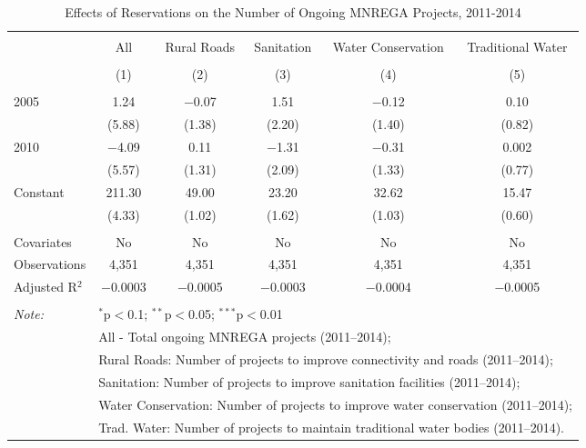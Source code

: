 
\begin{table}[!htbp] \centering 
  \caption{Effects of Reservations on the Number of Ongoing MNREGA Projects, 2011-2014} 
  \label{main_mnrega_ongoing} 
\begin{tabular}{@{\extracolsep{5pt}}lccccc} 
\\[-1.8ex]\hline 
\hline \\[-1.8ex] 
 & All & Rural Roads & Sanitation & Water Conservation & Traditional Water \\ 
\\[-1.8ex] & (1) & (2) & (3) & (4) & (5)\\ 
\hline \\[-1.8ex] 
 2005 & 1.24 & $-$0.07 & 1.51 & $-$0.12 & 0.10 \\ 
  & (5.88) & (1.38) & (2.20) & (1.40) & (0.82) \\ 
  2010 & $-$4.09 & 0.11 & $-$1.31 & $-$0.31 & 0.002 \\ 
  & (5.57) & (1.31) & (2.09) & (1.33) & (0.77) \\ 
  Constant & 211.30 & 49.00 & 23.20 & 32.62 & 15.47 \\ 
  & (4.33) & (1.02) & (1.62) & (1.03) & (0.60) \\ 
 \hline \\[-1.8ex] 
Covariates & No & No & No & No & No \\ 
Observations & 4,351 & 4,351 & 4,351 & 4,351 & 4,351 \\ 
Adjusted R$^{2}$ & $-$0.0003 & $-$0.0005 & $-$0.0003 & $-$0.0004 & $-$0.0005 \\ 
\hline 
\hline \\[-1.8ex] 
\textit{Note:}  & \multicolumn{5}{l}{$^{*}$p$<$0.1; $^{**}$p$<$0.05; $^{***}$p$<$0.01} \\ 
 & \multicolumn{5}{l}{All - Total ongoing MNREGA projects (2011--2014);} \\ 
 & \multicolumn{5}{l}{Rural Roads: Number of projects to improve connectivity and roads (2011--2014);} \\ 
 & \multicolumn{5}{l}{Sanitation:  Number of projects to improve sanitation facilities  (2011--2014);} \\ 
 & \multicolumn{5}{l}{Water Conservation: Number of projects to improve water conservation (2011--2014);} \\ 
 & \multicolumn{5}{l}{Trad. Water: Number of projects to maintain traditional water bodies (2011--2014).} \\ 
\end{tabular} 
\end{table} 
